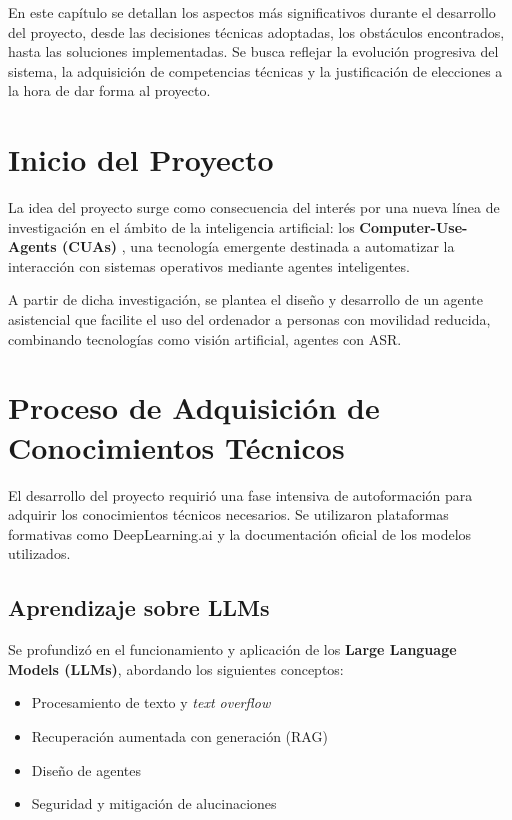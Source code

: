 
En este capítulo se detallan los aspectos más significativos durante el desarrollo del proyecto, desde las decisiones técnicas adoptadas, los obstáculos encontrados, hasta las soluciones implementadas. Se busca reflejar la evolución progresiva del sistema, la adquisición de competencias técnicas y la justificación de elecciones a la hora de dar forma al proyecto.

\section{Inicio del Proyecto}

La idea del proyecto surge como consecuencia del interés por una nueva línea de investigación en el ámbito de la inteligencia artificial: los \textbf{Computer-Use-Agents (CUAs)} \cite{OmniParser,Anthropic_CUA}, una tecnología emergente destinada a automatizar la interacción con sistemas operativos mediante agentes inteligentes.

A partir de dicha investigación, se plantea el diseño y desarrollo de un agente asistencial que facilite el uso del ordenador a personas con movilidad reducida, combinando tecnologías como visión artificial, agentes con ASR.

\newpage

\section{Proceso de Adquisición de Conocimientos Técnicos}

El desarrollo del proyecto requirió una fase intensiva de autoformación para adquirir los conocimientos técnicos necesarios. Se utilizaron plataformas formativas como DeepLearning.ai\cite{deeplearning} y la documentación oficial de los modelos utilizados.

\subsection{Aprendizaje sobre LLMs}
Se profundizó en el funcionamiento y aplicación de los \textbf{Large Language Models (LLMs)}, abordando los siguientes conceptos:

\begin{itemize}
    \item Procesamiento de texto y \textit{text overflow}
    \item Recuperación aumentada con generación (RAG)
    \item Diseño de agentes
    \item Seguridad y mitigación de alucinaciones
\end{itemize}

